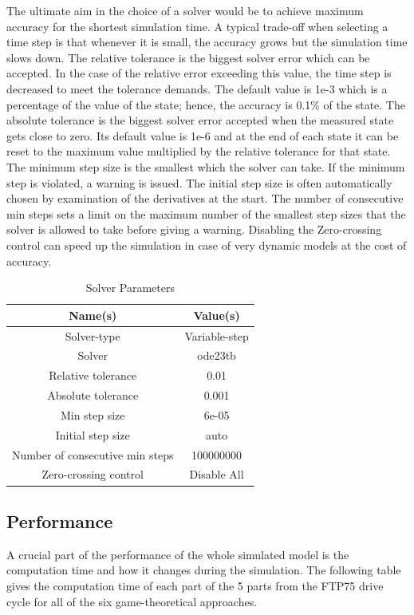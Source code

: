 The ultimate aim in the choice of a solver would be to achieve maximum accuracy for the shortest simulation time. A typical trade-off when selecting a time step is that whenever it is small, the accuracy grows but the simulation time slows down. The relative tolerance is the biggest solver error which can be accepted. In the case of the relative error exceeding this value, the time step is decreased to meet the tolerance demands. The default value is 1e-3 which is a percentage of the value of the state; hence, the accuracy is 0.1\% of the state. The absolute tolerance is the biggest solver error accepted when the measured state gets close to zero. Its default value is 1e-6 and at the end of each state it can be reset to the maximum value multiplied by the relative tolerance for that state. The minimum step size is the smallest which the solver can take. If the minimum step is violated, a warning is issued. The initial step size is often automatically chosen by examination of the derivatives at the start. The number of consecutive min steps sets a limit on the maximum number of the smallest step sizes that the solver is allowed to take before giving a warning. Disabling the Zero-crossing control can speed up the simulation in case of very dynamic models at the cost of accuracy.

\begin{table}[h]
\centering
\begin{tabular}{ |c|c| } 
 \hline
 Name(s) & Value(s) \\
 \hline\hline
 Solver-type & Variable-step  \\ 
 Solver & ode23tb \\ 
 Relative tolerance & 0.01 \\ 
 Absolute tolerance & 0.001 \\
 Min step size & 6e-05 \\
 Initial step size & auto \\ 
 Number of consecutive min steps & 100000000 \\
 Zero-crossing control & Disable All \\
 \hline
\end{tabular}
\caption{Solver Parameters}
\label{tab:config}
\end{table}

\subsection{Performance}
A crucial part of the performance of the whole simulated model is the computation time and how it changes during the simulation. The following table gives the computation time of each part of the 5 parts from the FTP75 drive cycle for all of the six game-theoretical approaches.

